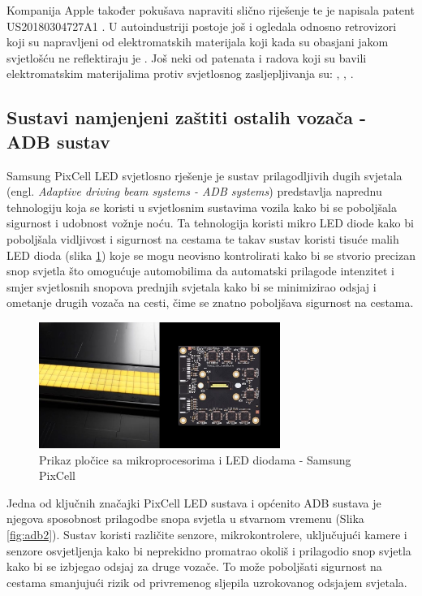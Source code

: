 \documentclass{foi}
\begin{document}
Kompanija Apple također pokušava napraviti slično riješenje te je napisala patent \newline US20180304727A1 \cite{OwenMal2018} \cite{Apple2016}. U autoindustriji postoje još i ogledala odnosno retrovizori koji su napravljeni od elektromatskih materijala koji kada su obasjani jakom svjetlošću ne reflektiraju je \cite{Daniel2022}. Još neki od patenata i radova koji su bavili elektromatskim materijalima protiv svjetlosnog zasljepljivanja su: \cite{KumarB2020}, \cite{Dewayne}, \cite{Yuter2010}.

\subsection{Sustavi namjenjeni zaštiti ostalih vozača - ADB sustav}

Samsung PixCell LED svjetlosno rješenje je sustav prilagodljivih dugih svjetala (engl. \emph{Adaptive driving beam systems - ADB systems}) predstavlja naprednu tehnologiju koja se koristi u svjetlosnim sustavima vozila kako bi se poboljšala sigurnost i udobnost vožnje noću. Ta tehnologija koristi mikro LED diode kako bi poboljšala vidljivost i sigurnost na cestama te takav sustav koristi tisuće malih LED dioda (slika \ref{fig:adb}) koje se mogu neovisno kontrolirati kako bi se stvorio precizan snop svjetla što omogućuje automobilima da automatski prilagode intenzitet i smjer svjetlosnih snopova prednjih svjetala kako bi se minimizirao odsjaj i ometanje drugih vozača na cesti, čime se znatno poboljšava sigurnost na cestama. \cite{Samsung2021}

\begin{figure}[h!]
    \centering
    \includegraphics[width=0.7\textwidth]{slike/adb}
    \caption{Prikaz pločice sa mikroprocesorima i LED diodama - Samsung PixCell \cite{Samsung2021}}
    \label{fig:adb}
\end{figure}

Jedna od ključnih značajki PixCell LED sustava i općenito ADB sustava je njegova sposobnost prilagodbe snopa svjetla u stvarnom vremenu (Slika \ref{fig:adb2}). Sustav koristi različite senzore, mikrokontrolere, uključujući kamere i senzore osvjetljenja kako bi neprekidno promatrao okoliš i prilagodio snop svjetla kako bi se izbjegao odsjaj za druge vozače. To može poboljšati sigurnost na cestama smanjujući rizik od privremenog sljepila uzrokovanog odsjajem svjetala. \cite{Samsung2021}
\end{document}
